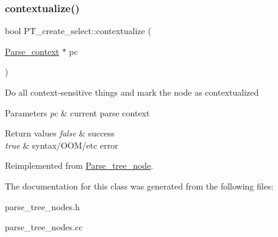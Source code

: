 \subsubsection{\texorpdfstring{contextualize()}{contextualize()}}
{\footnotesize\ttfamily bool P\+T\+\_\+create\+\_\+select\+::contextualize (\begin{DoxyParamCaption}\item[{\mbox{\hyperlink{structParse__context}{Parse\+\_\+context}} $\ast$}]{pc }\end{DoxyParamCaption})\hspace{0.3cm}{\ttfamily [virtual]}}

Do all context-\/sensitive things and mark the node as contextualized


\begin{DoxyParams}{Parameters}
{\em pc} & current parse context\\
\hline
\end{DoxyParams}

\begin{DoxyRetVals}{Return values}
{\em false} & success \\
\hline
{\em true} & syntax/\+O\+O\+M/etc error \\
\hline
\end{DoxyRetVals}


Reimplemented from \mbox{\hyperlink{classParse__tree__node_a22d93524a537d0df652d7efa144f23da}{Parse\+\_\+tree\+\_\+node}}.



The documentation for this class was generated from the following files\+:\begin{DoxyCompactItemize}
\item 
parse\+\_\+tree\+\_\+nodes.\+h\item 
parse\+\_\+tree\+\_\+nodes.\+cc\end{DoxyCompactItemize}
